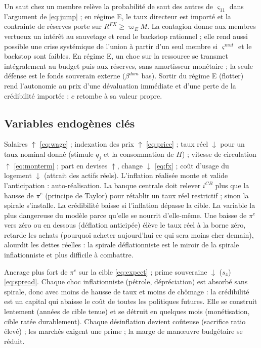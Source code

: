 \documentclass[11pt,a4paper]{article}
\newcommand{\up}{$\uparrow$}
\newcommand{\dn}{$\downarrow$}
\begin{document}
\direct Un saut chez un membre relève la probabilité de saut des autres de $\varsigma_{11}$ dans l'argument de \eqref{eq:jump} ; en régime E, le taux directeur est importé et la contrainte de réserves porte sur $R^{FX}\ge\varpi_E M$.
\second La contagion donne aux membres vertueux un intérêt au sauvetage et rend le backstop rationnel ; elle rend aussi possible une crise systémique de l'union à partir d'un seul membre si $\varsigma^{mut}$ et le backstop sont faibles. En régime E, un choc sur la ressource se transmet intégralement au budget puis aux réserves, sans amortisseur monétaire ; la seule défense est le fonds souverain externe ($\beta^{dom}$ bas).
\baisse Sortir du régime E (flotter) rend l'autonomie au prix d'une dévaluation immédiate et d'une perte de la crédibilité importée : $c$ retombe à sa valeur propre.

\subsection{Variables endogènes clés}

\direct Salaires \up{} \eqref{eq:wage} ; indexation des prix \up{} \eqref{eq:price} ; taux réel \dn{} pour un taux nominal donné (stimule $q_j$ et la consommation de $H$) ; vitesse de circulation \up{} \eqref{eq:monterm} ; part en devises \up{}, change \dn{} \eqref{eq:fx} ; coût d'usage du logement \dn{} (attrait des actifs réels).
\second L'inflation réalisée monte et valide l'anticipation : auto-réalisation. La banque centrale doit relever $i^{CB}$ plus que la hausse de $\pi^e$ (principe de Taylor) pour rétablir un taux réel restrictif ; sinon la spirale s'installe. La crédibilité baisse si l'inflation dépasse la cible. La variable la plus dangereuse du modèle parce qu'elle se nourrit d'elle-même.
\baisse Une baisse de $\pi^e$ vers zéro ou en dessous (déflation anticipée) élève le taux réel à la borne zéro, retarde les achats (pourquoi acheter aujourd'hui ce qui sera moins cher demain), alourdit les dettes réelles : la spirale déflationniste est le miroir de la spirale inflationniste et plus difficile à combattre.

\direct Ancrage plus fort de $\pi^e$ sur la cible \eqref{eq:expect} ; prime souveraine \dn{} ($s_4$) \eqref{eq:spread}.
\second Chaque choc inflationniste (pétrole, dépréciation) est absorbé sans spirale, donc avec moins de hausse de taux et moins de chômage : la crédibilité est un capital qui abaisse le coût de toutes les politiques futures. Elle se construit lentement (années de cible tenue) et se détruit en quelques mois (monétisation, cible ratée durablement).
\baisse Chaque désinflation devient coûteuse (sacrifice ratio élevé) ; les marchés exigent une prime ; la marge de manœuvre budgétaire se réduit.
\end{document}

